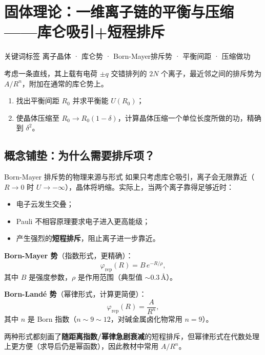 \section{固体理论：一维离子链的平衡与压缩——库仑吸引+短程排斥}
\label{sec:ion-chain-compression}

\begin{tipbox}{关键词标签}
离子晶体 · 库仑势 · Born-Mayer排斥势 · 平衡间距 · 压缩做功
\end{tipbox}

\begin{modelbox}
考虑一条直线，其上载有电荷 $\pm q$ 交错排列的 $2N$ 个离子，最近邻之间的排斥势为 $A/R^n$，附加在通常的库仑势上。
\begin{enumerate}[nosep]
  \item 找出平衡间距 $R_0$ 并求平衡能 $U(R_0)$；
  \item 使晶体压缩至 $R_0 \to R_0(1-\delta)$，计算晶体压缩一个单位长度所做的功，精确到 $\delta^2$。
\end{enumerate}
\end{modelbox}

\subsection{概念铺垫：为什么需要排斥项？}

\begin{modelbox}{Born-Mayer 排斥势的物理来源与形式}
如果只考虑库仑吸引，离子会无限靠近（$R\to 0$ 时 $U\to -\infty$），晶体将坍缩。实际上，当两个离子靠得足够近时：
\begin{itemize}[nosep]
  \item 电子云发生交叠；
  \item Pauli 不相容原理要求电子进入更高能级；
  \item 产生强烈的\textbf{短程排斥}，阻止离子进一步靠近。
\end{itemize}

\textbf{Born-Mayer 势}（指数形式，更精确）：
\[
  \varphi_{\text{rep}}(R) = B\,e^{-R/\rho},
\]
其中 $B$ 是强度参数，$\rho$ 是作用范围（典型值 $\sim 0.3\,\text{\AA}$）。

\textbf{Born-Land\'{e} 势}（幂律形式，计算更简便）：
\[
  \varphi_{\text{rep}}(R) = \frac{A}{R^n},
\]
其中 $n$ 是 Born 指数（$n \sim 9\sim 12$，对碱金属卤化物常用 $n=9$）。

两种形式都刻画了\textbf{随距离指数/幂律急剧衰减}的短程排斥，但幂律形式在代数处理上更方便（求导后仍是幂函数），因此教材中常用 $A/R^n$。
\end{modelbox}

